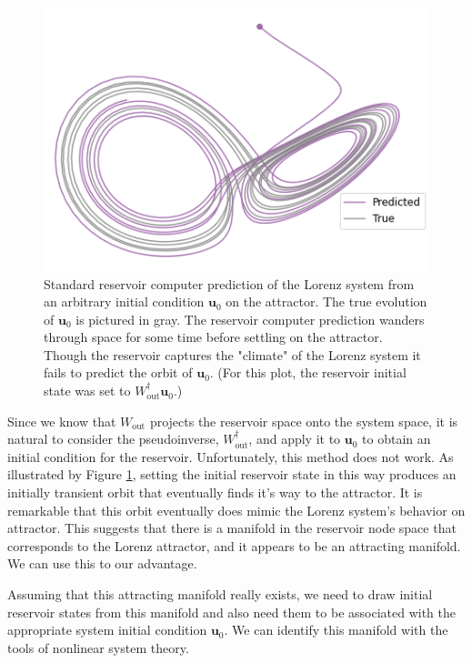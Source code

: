 \documentclass[journal]{journal}
\begin{document}
\begin{figure}[h] \label{trueinitial}

\centering
\includegraphics[scale=.25]{Images/trueinitiallorenz.png}
\caption{Standard reservoir computer prediction of the Lorenz system from an arbitrary initial condition $\mathbf{u}_0$ on the attractor. The true evolution of $\mathbf{u}_0$ is pictured in gray. The reservoir computer  prediction wanders through space for some time before settling on the attractor. Though the reservoir captures the "climate" of the Lorenz system it fails to predict the orbit of $\mathbf{u}_0$.  (For this plot, the reservoir initial state was set to $W_\text{out}^\dagger \mathbf{u}_0$.) }
\end{figure}

Since we know that $W_\text{out}$ projects the reservoir space onto the system space, it is natural to consider the pseudoinverse, $W_\text{out}^\dagger$, and apply it to $\mathbf{u}_0$ to obtain an initial condition for the reservoir. Unfortunately, this method does not work. As illustrated by Figure \ref{trueinitial}, setting the initial reservoir state in this way produces an initially transient orbit that eventually finds it's way to the attractor. It is remarkable that this orbit eventually does mimic the Lorenz system's behavior on attractor. This suggests that there is a manifold in the reservoir node space that corresponds to the Lorenz attractor, and it appears to be an attracting manifold. We can use this to our advantage.

Assuming that this attracting manifold really exists, we need to draw initial reservoir states from this manifold and also need them to be associated with the appropriate system initial condition $\mathbf{u}_0$. We can identify this manifold with the tools of nonlinear system theory.
\end{document}
